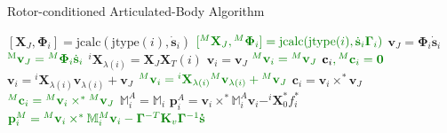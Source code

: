 \begin{algorithm}
    \caption{Rotor-conditioned Articulated-Body Algorithm}
    \label{alg:rotaba}
    \begin{algorithmic}[1]
        \State $[\mathbf{X}_J, \boldsymbol{\Phi}_i] = \text{jcalc}(\text{jtype}(i), \dot{\mathbf{s}}_i)$
        \State $\color{webgreen}{[{} ^M\mathbf{X}_J, {} ^M\boldsymbol{\Phi}_i] = \text{jcalc}(\text{jtype}(i), \dot{\mathbf{s}}_i \boldsymbol{\Gamma} _i)}$
        \State $\mathrm{\mathbf{v}}_J = \boldsymbol{\Phi}_i \dot{\mathbf{s}}_i$
        \State $\color{webgreen}{\mathrm{{} ^M\mathbf{v}}_J = {} ^M\boldsymbol{\Phi}_i \dot{\mathbf{s}}_i}$
        \State $^i\mathbf{X}_{\lambda(i)} = \mathbf{X}_J\mathbf{X}_T (i)$
        \State $\mathrm{\mathbf{v}}_i = \mathrm{\mathbf{v}}_J$
        \State $\color{webgreen}{{}^M\mathrm{\mathbf{v}}_i = {}^M\mathrm{\mathbf{v}}_J}$
        \State $\mathbf{c}_i \color{webgreen}{,{}^M\mathbf{c}_i} = \mathbf{0}$
        \Else
        \State $\mathrm{\mathbf{v}}_i = {}^i\mathbf{X} _{\lambda(i)}\mathrm{\mathbf{v}}_{\lambda(i)} + \mathrm{\mathbf{v}}_J$
        \State $\color{webgreen}{{}^M\mathrm{\mathbf{v}}_i =  {}^i\mathbf{X} _{\lambda(i)} {}^M\mathrm{\mathbf{v}}_{\lambda(i)} + {}^M\mathrm{\mathbf{v}}_J}$
        \State $\mathbf{c}_i = \mathrm{\mathbf{v}}_i \times ^* \mathrm{\mathbf{v}}_J$
        \State $\color{webgreen}{{}^M\mathbf{c}_i = {}^M\mathrm{\mathbf{v}}_i \times ^* {}^M\mathrm{\mathbf{v}}_J}$
        \EndIf
        \State $\mathbb{M}_i ^A = \mathbb{M}_i$
        \State $\mathbf{p}_i ^A = \mathrm{\mathbf{v}}_i \times^* \mathbb{M}_i ^A \mathrm{\mathbf{v}}_i - ^i\mathbf{X} _0 ^* f ^* _i $
        \State $\color{webgreen}{\mathbf{p}_i ^M = {} ^M\mathrm{\mathbf{v}}_i \times^* \mathbb{M}_i ^M\mathrm{\mathbf{v}}_i - \boldsymbol{\Gamma} ^{-T}\mathbf{K}_v \boldsymbol{\Gamma} ^{-1} \mathbf{\dot{s}}}$
        \EndFor


\end{algorithmic}
\end{algorithm}
